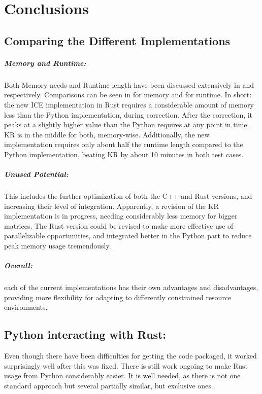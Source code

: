 \chapter{Conclusions}\label{chap:conclusion}


\section{Comparing the Different Implementations}

\paragraph{Memory and Runtime:}
Both Memory needs and Runtime length have been discussed extensively in
 and  respectively. Comparisons can be
seen in  for memory and  for runtime.
In short: the new ICE implementation in Rust requires a considerable amount of
memory less than the Python implementation, during correction. After the
correction, it peaks at a slightly higher value than the Python requires at any
point in time. KR is in the middle for both, memory-wise. Additionally, the new
implementation requires only about half the runtime length compared to the
Python implementation, beating KR by about 10 minutes in both test cases.


\paragraph{Unused Potential:}\label{sec:potential} This includes the further
optimization of both the C++ and Rust versions, and increasing their level of
integration. Apparently, a revision of the KR implementation is in progress,
needing considerably less memory for bigger matrices. The Rust version could be
revised to make more effective use of parallelizable opportunities, and
integrated better in the Python part to reduce peak memory usage tremendously.


\paragraph{Overall:} each of the current implementations has their own
advantages and disadvantages, providing more flexibility for adapting to
differently constrained resource environments.


\section{Python interacting with Rust:} Even though there have been
difficulties for getting the code packaged, it worked surprisingly well after
this was fixed. There is still work ongoing to make Rust usage from Python
considerably easier. It is well needed, as there is not one standard
approach but several partially similar, but exclusive ones.


